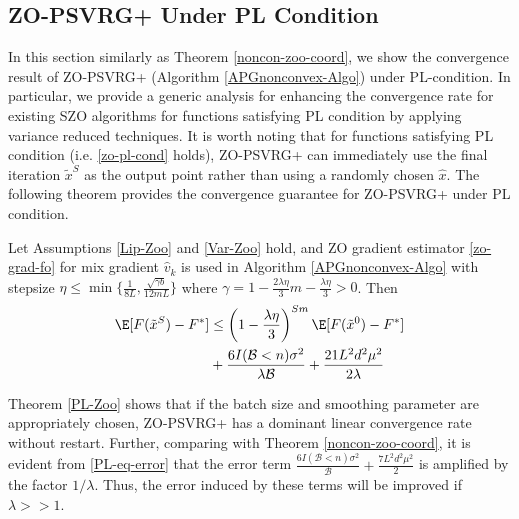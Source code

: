 \subsection{ZO-PSVRG+ Under PL Condition}
In this section similarly as Theorem \ref{noncon-zoo-coord}, we show the convergence result of ZO-PSVRG+ (Algorithm \ref{APGnonconvex-Algo}) under PL-condition. In particular, we provide a generic analysis for enhancing the convergence rate for existing SZO algorithms for functions satisfying PL condition by applying variance reduced techniques. It is worth noting that for functions satisfying PL condition (i.e. \eqref{zo-pl-cond} holds), ZO-PSVRG+ can immediately use the final iteration $\tilde{x}^S$
as the output point rather than using a randomly chosen
$\hat{x}$. 
The following theorem provides the convergence guarantee for ZO-PSVRG+ under PL condition.

\begin{theorem}\label{PL-Zoo}
Let Assumptions \ref{Lip-Zoo} and \ref{Var-Zoo} hold, and  ZO gradient estimator \eqref{zo-grad-fo} for mix gradient $\hat{v}_k$ is  used  in  Algorithm \ref{APGnonconvex-Algo} with stepsize $\eta \leq \min\{\frac{1}{8L}, \frac{\sqrt{\gamma b}}{12 m L }\}$ where $\gamma = 1-\frac{2\lambda\eta}{3} m-\frac{\lambda\eta}{3} > 0$. Then 
\begin{align}
\E[F(\tilde{x}^S) - {F}^*] & \leq   \left(1-\frac{\lambda\eta}{3}\right)^{Sm} \E[F(\tilde{x}^0) - {F}^*]\notag\\
& + \frac{6I(\mathcal{B} < n) \sigma ^2}{\lambda \mathcal{B}}+\frac{21 L^2 d^2 \mu^2}{2\lambda}\label{PL-eq-error}
\end{align}
\end{theorem}
Theorem \ref{PL-Zoo} shows that if the batch size and smoothing parameter are  appropriately chosen, ZO-PSVRG+ has a dominant linear convergence rate without restart. Further, comparing with Theorem \ref{noncon-zoo-coord}, it is evident from \eqref{PL-eq-error} that the  error term $\frac{6I(\mathcal{B} < n) \sigma ^2}{\mathcal{B}}+\frac{7L^2 d^2 \mu^2}{2}$ is amplified by the factor $1/\lambda$. Thus, the error induced by these terms will be improved if $\lambda >> 1$.

